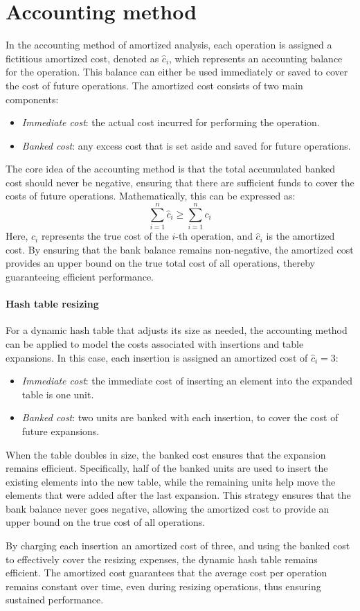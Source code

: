\section{Accounting method}

In the accounting method of amortized analysis, each operation is assigned a fictitious amortized cost, denoted as $\hat{c}_i$, which represents an accounting balance for the operation. 
This balance can either be used immediately or saved to cover the cost of future operations. 
The amortized cost consists of two main components: 
\begin{itemize} 
    \item \textit{Immediate cost}: the actual cost incurred for performing the operation. 
    \item \textit{Banked cost}: any excess cost that is set aside and saved for future operations. 
\end{itemize}
The core idea of the accounting method is that the total accumulated banked cost should never be negative, ensuring that there are sufficient funds to cover the costs of future operations. 
Mathematically, this can be expressed as:
\[\sum_{i=1}^n\hat{c}_i\geq\sum_{i=1}^nc_i\]
Here, $c_i$ represents the true cost of the $i$-th operation, and $\hat{c}_i$ is the amortized cost.
By ensuring that the bank balance remains non-negative, the amortized cost provides an upper bound on the true total cost of all operations, thereby guaranteeing efficient performance.

\paragraph*{Hash table resizing}
For a dynamic hash table that adjusts its size as needed, the accounting method can be applied to model the costs associated with insertions and table expansions. 
In this case, each insertion is assigned an amortized cost of $\hat{c}_i = 3$: 
\begin{itemize}
    \item \textit{Immediate cost}: the immediate cost of inserting an element into the expanded table is one unit. 
    \item \textit{Banked cost}: two units are banked with each insertion, to cover the cost of future expansions. 
\end{itemize}
When the table doubles in size, the banked cost ensures that the expansion remains efficient.
Specifically, half of the banked units are used to insert the existing elements into the new table, while the remaining units help move the elements that were added after the last expansion. 
This strategy ensures that the bank balance never goes negative, allowing the amortized cost to provide an upper bound on the true cost of all operations.

By charging each insertion an amortized cost of three, and using the banked cost to effectively cover the resizing expenses, the dynamic hash table remains efficient. 
The amortized cost guarantees that the average cost per operation remains constant over time, even during resizing operations, thus ensuring sustained performance.